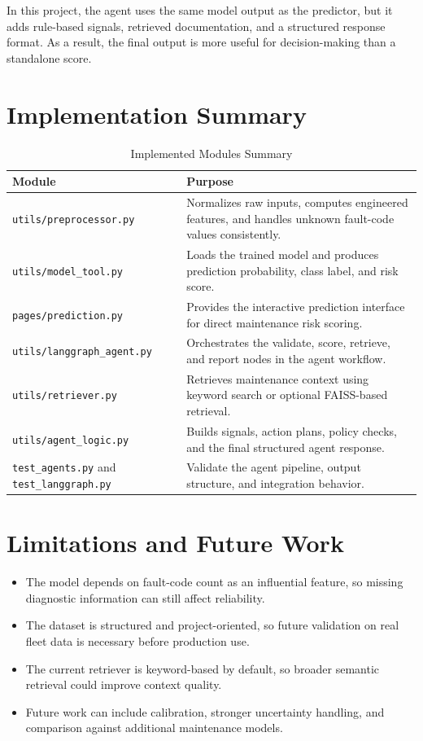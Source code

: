 \documentclass[12pt, a4paper]{article}
\begin{document}
In this project, the agent uses the same model output as the predictor, but it adds rule-based signals, retrieved documentation, and a structured response format. As a result, the final output is more useful for decision-making than a standalone score.

\section{Implementation Summary}

\begin{table}[H]
\centering
\caption{Implemented Modules Summary}
\begin{tabularx}{\textwidth}{p{4cm}X}
\toprule
\textbf{Module} & \textbf{Purpose} \\
\midrule
\texttt{utils/preprocessor.py} & Normalizes raw inputs, computes engineered features, and handles unknown fault-code values consistently. \\
\texttt{utils/model\_tool.py} & Loads the trained model and produces prediction probability, class label, and risk score. \\
\texttt{pages/prediction.py} & Provides the interactive prediction interface for direct maintenance risk scoring. \\
\texttt{utils/langgraph\_agent.py} & Orchestrates the validate, score, retrieve, and report nodes in the agent workflow. \\
\texttt{utils/retriever.py} & Retrieves maintenance context using keyword search or optional FAISS-based retrieval. \\
\texttt{utils/agent\_logic.py} & Builds signals, action plans, policy checks, and the final structured agent response. \\
\texttt{test\_agents.py} and \texttt{test\_langgraph.py} & Validate the agent pipeline, output structure, and integration behavior. \\
\bottomrule
\end{tabularx}
\end{table}

\section{Limitations and Future Work}

\begin{itemize}
\item The model depends on fault-code count as an influential feature, so missing diagnostic information can still affect reliability.
\item The dataset is structured and project-oriented, so future validation on real fleet data is necessary before production use.
\item The current retriever is keyword-based by default, so broader semantic retrieval could improve context quality.
\item Future work can include calibration, stronger uncertainty handling, and comparison against additional maintenance models.
\end{itemize}
\end{document}
